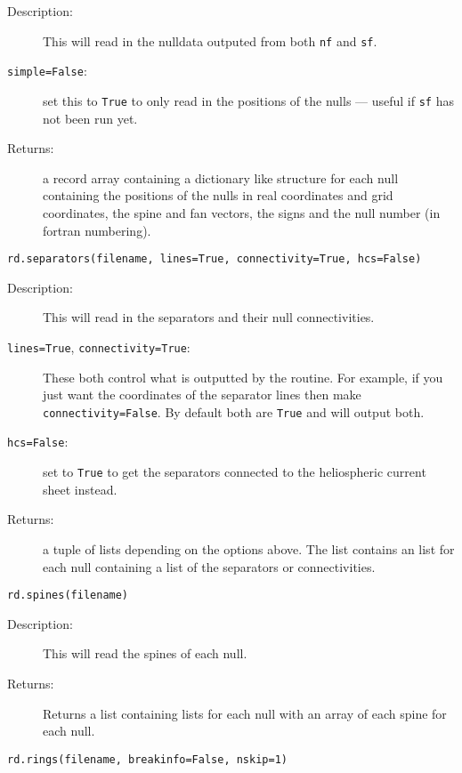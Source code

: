 \documentclass[12pt]{article}
\begin{document}
      \begin{description}
        \item [Description:] This will read in the nulldata outputed from both \texttt{nf} and \texttt{sf}.

        \item [\texttt{simple=False}:] set this to \texttt{True} to only read in the positions of the nulls --- useful if \texttt{sf} has not been run yet.

        \item [Returns:] a record array containing a dictionary like structure for each null containing the positions of the nulls in real coordinates and grid coordinates, the spine and fan vectors, the signs and the null number (in fortran numbering).
      \end{description}

      \texttt{rd.separators(filename, lines=True, connectivity=True, hcs=False)}

      \begin{description}
        \item [Description:] This will read in the separators and their null connectivities.
        \item [\texttt{lines=True}, \texttt{connectivity=True}:] These both control what is outputted by the routine. For example, if you just want the coordinates of the separator lines then make \texttt{connectivity=False}. By default both are \texttt{True} and will output both.
        \item [\texttt{hcs=False}:] set to \texttt{True} to get the separators connected to the heliospheric current sheet instead.
        \item [Returns:] a tuple of lists depending on the options above. The list contains an list for each null containing a list of the separators or connectivities.
      \end{description}

      \texttt{rd.spines(filename)}

      \begin{description}
        \item [Description:] This will read the spines of each null.
        \item [Returns:] Returns a list containing lists for each null with an array of each spine for each null.
      \end{description}

      \texttt{rd.rings(filename, breakinfo=False, nskip=1)}
\end{document}
